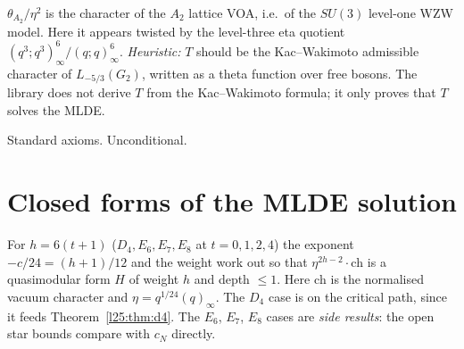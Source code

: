 \begin{physics}
$\theta_{A_2}/\eta^2$ is the character of the $A_2$ lattice VOA, i.e.\ of the $SU(3)$ level-one WZW model. Here it
appears twisted by the level-three eta quotient $(q^3;q^3)^6_\infty/(q;q)^6_\infty$. \emph{Heuristic:} $T$ should be the
Kac--Wakimoto admissible character of $L_{-5/3}(G_2)$, written as a theta function over free bosons. The library does
not derive $T$ from the Kac--Wakimoto formula; it only proves that $T$ solves the MLDE.
\end{physics}
\begin{status}
Standard axioms. Unconditional.
\end{status}

\section{Closed forms of the MLDE solution}\label{l25:sec:closed}

For $h=6(t+1)$ ($D_4,E_6,E_7,E_8$ at $t=0,1,2,4$) the exponent $-c/24=(h+1)/12$ and the weight work out so that
$\eta^{2h-2}\cdot\mathrm{ch}$ is a quasimodular form $H$ of weight $h$ and depth $\le1$. Here $\mathrm{ch}$ is the
normalised vacuum character and $\eta=q^{1/24}(q)_\infty$. The $D_4$ case is on the critical path, since it feeds
Theorem~\ref{l25:thm:d4}. The $E_6$, $E_7$, $E_8$ cases are \emph{side results}: the open star bounds compare with $c_N$
directly.

